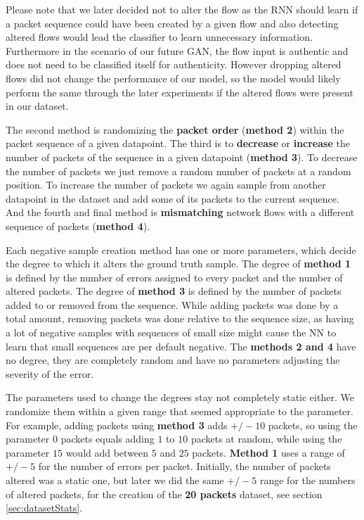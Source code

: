 \documentclass[
	ngerman,
	ruledheaders=section,%
	class=report,%
	thesis={type=bachelor},%
	accentcolor=9c,%
	custommargins=true,%
	marginpar=false,%
	parskip=half-,%
	fontsize=11pt,%
]{tudapub}
\begin{document}
Please note that we later decided not to alter the flow as the RNN should learn if a packet sequence could have been created by a given flow and also detecting altered flows would lead the classifier to learn unnecessary information.
Furthermore in the scenario of our future GAN, the flow input is authentic and does not need to be classified itself for authenticity.
However dropping altered flows did not change the performance of our model, so the model would likely perform the same through the later experiments if the altered flows were present in our dataset.

The second method is randomizing the \textbf{packet order} (\textbf{method 2}) within the packet sequence of a given datapoint.
The third is to \textbf{decrease} or \textbf{increase} the number of packets of the sequence in a given datapoint (\textbf{method 3}).
To decrease the number of packets we just remove a random number of packets at a random position.
To increase the number of packets we again sample from another datapoint in the dataset and add some of its packets to the current sequence.
And the fourth and final method is \textbf{mismatching} network flows with a different sequence of packets (\textbf{method 4}).

Each negative sample creation method has one or more parameters, which decide the degree to which it alters the ground truth sample.
The degree of \textbf{method 1} is defined by the number of errors assigned to every packet and the number of altered packets.
The degree of \textbf{method 3} is defined by the number of packets added to or removed from the sequence.
While adding packets was done by a total amount, removing packets was done relative to the sequence size, as having a lot of negative samples with sequences of small size might cause the NN to learn that small sequences are per default negative.
The \textbf{methods 2 and 4} have no degree, they are completely random and have no parameters adjusting the severity of the error.

The parameters used to change the degrees stay not completely static either.
We randomize them within a given range that seemed appropriate to the parameter.
For example, adding packets using \textbf{method 3} adds $+/-10$ packets, so using the parameter $0$ packets equals adding $1$ to $10$ packets at random, while using the parameter $15$ would add between $5$ and $25$ packets.
\textbf{Method 1} uses a range of $+/-5$ for the number of errors per packet.
Initially, the number of packets altered was a static one, but later we did the same $+/-5$ range for the numbers of altered packets, for the creation of the \textbf{20 packets} dataset, see section \ref{sec:datasetStats}.
\end{document}
